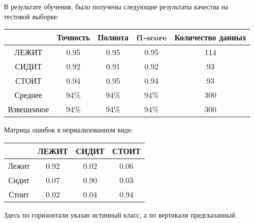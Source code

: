 В результате обучения, было получены следующие результаты качества на тестовой выборке:

\begin{center}
    \begin{tabular}{ | c | c c c | c |} \hline
           & Точность &  Полнота & f1-score & Количество данных \\\hline

       ЛЕЖИТ  &    0.95  &    0.95  &    0.95  &    114 \\
       СИДИТ  &    0.92  &    0.91  &    0.92  &    93 \\
       СТОИТ  &    0.94  &    0.95  &    0.94  &    93 \\\hline
   Среднее    &  94\% &  94\% &  94\% &  300  \\
 Взвешенное   &  94\% &  94\% &  94\% &  300  \\\hline
    \end{tabular}
\end{center}

Матрица ошибок в нормализованном виде:

\begin{center}
    \begin{tabular}{| c | c | c | c |}\hline
            & ЛЕЖИТ & СИДИТ & СТОИТ \\\hline
    Лежит   & 0.92 & 0.02 & 0.06 \\
    Сидит   & 0.07 & 0.90 & 0.03 \\
    Стоит   & 0.02 & 0.04 & 0.94 \\\hline
    \end{tabular}
\end{center}

Здесь по горизонтали указан истинный класс, а по вертикали предсказанный. 


%        
%        
